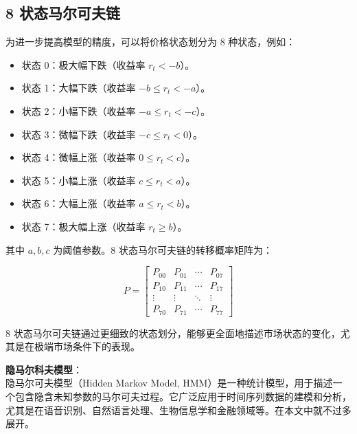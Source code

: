 \documentclass[a4paper]{article}
\begin{document}
\subsection{{8 状态马尔可夫链}}
为进一步提高模型的精度，可以将价格状态划分为 8 种状态，例如：
\begin{itemize}
    \item 状态 0：极大幅下跌（收益率 \( r_t < -b \)）。
    \item 状态 1：大幅下跌（收益率 \( -b \leq r_t < -a \)）。
    \item 状态 2：小幅下跌（收益率 \( -a \leq r_t < -c \)）。
    \item 状态 3：微幅下跌（收益率 \( -c \leq r_t < 0 \)）。
    \item 状态 4：微幅上涨（收益率 \( 0 \leq r_t < c \)）。
    \item 状态 5：小幅上涨（收益率 \( c \leq r_t < a \)）。
    \item 状态 6：大幅上涨（收益率 \( a \leq r_t < b \)）。
    \item 状态 7：极大幅上涨（收益率 \( r_t \geq b \)）。
\end{itemize}
其中 \( a, b, c \) 为阈值参数。8 状态马尔可夫链的转移概率矩阵为：

\[
P = \begin{bmatrix}
P_{00} & P_{01} & \cdots & P_{07} \\
P_{10} & P_{11} & \cdots & P_{17} \\
\vdots & \vdots & \ddots & \vdots \\
P_{70} & P_{71} & \cdots & P_{77}
\end{bmatrix}
\]

8 状态马尔可夫链通过更细致的状态划分，能够更全面地描述市场状态的变化，尤其是在极端市场条件下的表现。

\noindent \textbf{隐马尔科夫模型}： \\
隐马尔可夫模型（Hidden Markov Model, HMM）是一种统计模型，用于描述一个包含隐含未知参数的马尔可夫过程。它广泛应用于时间序列数据的建模和分析，尤其是在语音识别、自然语言处理、生物信息学和金融领域等。在本文中就不过多展开。
\end{document}
